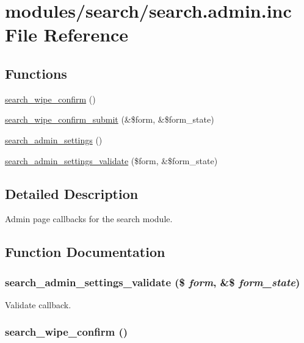 \hypertarget{search_8admin_8inc}{
\section{modules/search/search.admin.inc File Reference}
\label{search_8admin_8inc}
}
\subsection*{Functions}
\begin{CompactItemize}
\item 
\hyperlink{search_8admin_8inc_329adf5767886fffafee49298d3dce65}{search\_\-wipe\_\-confirm} ()
\item 
\hyperlink{search_8admin_8inc_a7853fc11d2c13207839da1f5bad4e8c}{search\_\-wipe\_\-confirm\_\-submit} (\&\$form, \&\$form\_\-state)
\item 
\hyperlink{group__forms_g9441f1f43f030e4a7fd39a7470e22f5f}{search\_\-admin\_\-settings} ()
\item 
\hyperlink{search_8admin_8inc_c02dbfc93e16ceefc020a119da393584}{search\_\-admin\_\-settings\_\-validate} (\$form, \&\$form\_\-state)
\end{CompactItemize}


\subsection{Detailed Description}
Admin page callbacks for the search module. 

\subsection{Function Documentation}
\hypertarget{search_8admin_8inc_c02dbfc93e16ceefc020a119da393584}{
\subsubsection[{search\_\-admin\_\-settings\_\-validate}]{\setlength{\rightskip}{0pt plus 5cm}search\_\-admin\_\-settings\_\-validate (\$ {\em form}, \/  \&\$ {\em form\_\-state})}}
\label{search_8admin_8inc_c02dbfc93e16ceefc020a119da393584}


Validate callback. \hypertarget{search_8admin_8inc_329adf5767886fffafee49298d3dce65}{
\subsubsection[{search\_\-wipe\_\-confirm}]{\setlength{\rightskip}{0pt plus 5cm}search\_\-wipe\_\-confirm ()}}
\label{search_8admin_8inc_329adf5767886fffafee49298d3dce65}


